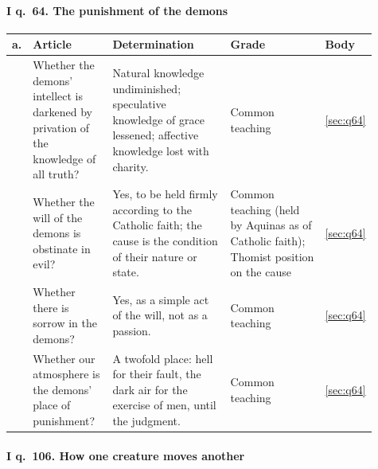 \paragraph{I q.~64. The punishment of the demons}

\begingroup\footnotesize
\begin{longtable}{>{\raggedright\arraybackslash}p{0.03\linewidth}>{\raggedright\arraybackslash}p{0.22\linewidth}>{\raggedright\arraybackslash}p{0.33\linewidth}>{\raggedright\arraybackslash}p{0.27\linewidth}>{\raggedright\arraybackslash}p{0.06\linewidth}}
\toprule
\textbf{a.} & \textbf{Article} & \textbf{Determination} & \textbf{Grade} & \textbf{Body}\\
\midrule
\endhead
1 & Whether the demons' intellect is darkened by privation of the knowledge of all truth? & Natural knowledge undiminished; speculative knowledge of grace lessened; affective knowledge lost with charity. & Common teaching & \ref{sec:q64}\\
2 & Whether the will of the demons is obstinate in evil? & Yes, to be held firmly according to the Catholic faith; the cause is the condition of their nature or state. & Common teaching (held by Aquinas as of Catholic faith); Thomist position on the cause & \ref{sec:q64}\\
3 & Whether there is sorrow in the demons? & Yes, as a simple act of the will, not as a passion. & Common teaching & \ref{sec:q64}\\
4 & Whether our atmosphere is the demons' place of punishment? & A twofold place: hell for their fault, the dark air for the exercise of men, until the judgment. & Common teaching & \ref{sec:q64}\\
\bottomrule
\end{longtable}
\endgroup

\paragraph{I q.~106. How one creature moves another}

